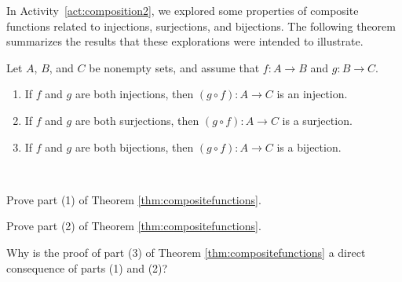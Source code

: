 In Activity~\ref{act:composition2}, we explored some properties of composite functions related to injections, surjections, and bijections.  The following theorem summarizes the results that these explorations were intended to illustrate.  

\begin{theorem} \label{thm:compositefunctions} Let  $A$, $B$, and  $C$  be nonempty sets, and assume that $f : A \to B$ and 
$g : B \to C$.

\begin{enumerate}
\item If  $f$  and  $g$  are both injections, then  $(g \circ f) : A \to C$  is an injection. 
\label{thm:compositefunctions1}

\item If  $f$  and  $g$  are both surjections, then  $(g \circ f) : A \to C$  is a surjection. \label{thm:compositefunctions2}

\item If  $f$  and  $g$  are both bijections, then  $(g \circ f) : A \to C$  is a bijection. \label{thm:compositefunctions3}
\end{enumerate}
\end{theorem}




\begin{activity} ~
	\ba
	\item Prove part (1) of Theorem \ref{thm:compositefunctions}.
		
	\item Prove part (2) of Theorem \ref{thm:compositefunctions}.
		
	\item Why is the proof of part (3) of  Theorem \ref{thm:compositefunctions} a direct consequence of parts (1) and (2)?
		
	\ea
\end{activity}



